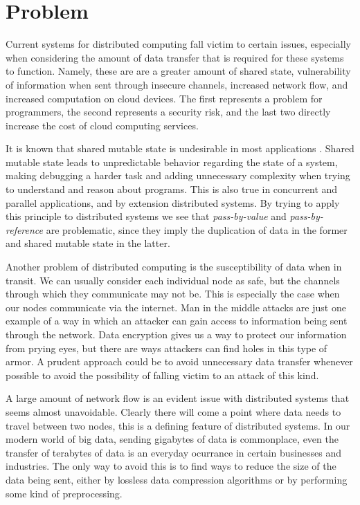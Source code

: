 
\chapter{Problem}
\label{cha:Problem}

Current systems for distributed computing fall victim to certain issues, especially when considering the amount of data transfer that is required for these systems to function. Namely, these are are a greater amount of shared state, vulnerability of information when sent through insecure channels, increased network flow, and increased computation on cloud devices. The first represents a problem for programmers, the second represents a security risk, and the last two directly increase the cost of cloud computing services.

It is known that shared mutable state is undesirable in most applications \cite{alma991003995329707681}. Shared mutable state leads to unpredictable behavior regarding the state of a system, making debugging a harder task and adding unnecessary complexity when trying to understand and reason about programs. This is also true in concurrent and parallel applications, and by extension distributed systems. By trying to apply this principle to distributed systems we see that \textit{pass-by-value} and \textit{pass-by-reference} are problematic, since they imply the duplication of data in the former and shared mutable state in the latter. 

Another problem of distributed computing is the susceptibility of data when in transit. We can usually consider each individual node as safe, but the channels through which they communicate may not be. This is especially the case when our nodes communicate via the internet. Man in the middle attacks are just one example of a way in which an attacker can gain access to information being sent through the network. Data encryption gives us a way to protect our information from prying eyes, but there are ways attackers can find holes in this type of armor. A prudent approach could be to avoid unnecessary data transfer whenever possible to avoid the possibility of falling victim to an attack of this kind.

A large amount of network flow is an evident issue with distributed systems that seems almost unavoidable. Clearly there will come a point where data needs to travel between two nodes, this is a defining feature of distributed systems. In our modern world of big data, sending gigabytes of data is commonplace, even the transfer of terabytes of data is an everyday ocurrance in certain businesses and industries. The only way to avoid this is to find ways to reduce the size of the data being sent, either by lossless data compression algorithms or by performing some kind of preprocessing. 

